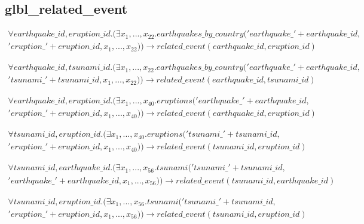 \documentclass{article}
\begin{document}
\subsection{glbl\_related\_event}

\begin{multline}
\forall earthquake\_id, eruption\_id.(
\exists x_1, ..., x_{22}.  earthquakes\_by\_country('earthquake\_' + earthquake\_id, \\ 'eruption\_' +  eruption\_id, x_1, ..., x_{22})) \longrightarrow related\_event(earthquake\_id, eruption\_id)
\end{multline} 


\begin{multline}
\forall earthquake\_id, tsunami\_id.(
\exists x_1, ..., x_{22}. earthquakes\_by\_country('earthquake\_' + earthquake\_id,\\ 'tsunami\_' +  tsunami\_id, x_1, ..., x_{22})) \longrightarrow related\_event(earthquake\_id, tsunami\_id)
\end{multline}

\begin{multline}
\forall earthquake\_id, eruption\_id.(
\exists x_1, ..., x_{40}. eruptions('earthquake\_' + earthquake\_id, \\ 'eruption\_' +  eruption\_id, x_1, ..., x_{40})) \longrightarrow related\_event(earthquake\_id, eruption\_id)
\end{multline} 

\begin{multline}
\forall tsunami\_id, eruption\_id.(
\exists x_1, ..., x_{40}. eruptions('tsunami\_' + tsunami\_id, \\ 'eruption\_' +  eruption\_id, x_1, ..., x_{40})) \longrightarrow related\_event(tsunami\_id, eruption\_id)
\end{multline} 

\begin{multline}
\forall tsunami\_id, earthquake\_id.(
\exists x_1, ..., x_{56}. tsunami('tsunami\_' + tsunami\_id, \\ 'earthquake\_' +  earthquake\_id, x_1, ..., x_{56})) \longrightarrow related\_event(tsunami\_id, earthquake\_id)
\end{multline} 

\begin{multline}
\forall tsunami\_id, eruption\_id.(
\exists x_1, ..., x_{56}. tsunami('tsunami\_' + tsunami\_id,\\ 'eruption\_' +  eruption\_id, x_1, ..., x_{56})) \longrightarrow related\_event(tsunami\_id, eruption\_id)
\end{multline} 
\end{document}
